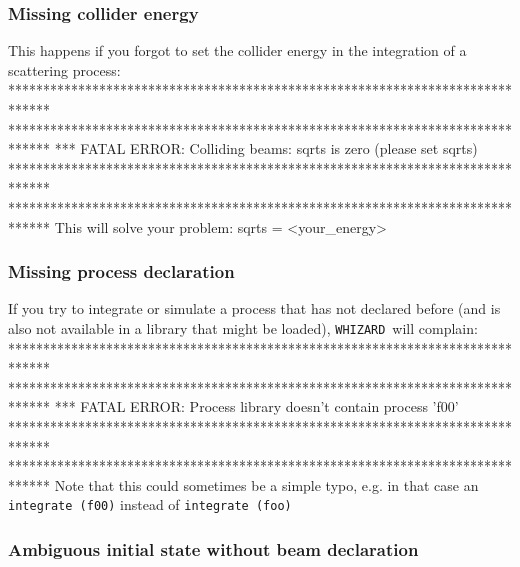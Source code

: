 \documentclass[12pt]{book}
\newenvironment{code}%
  {\begingroup\footnotesize
   \quote
   \Verbatim}%
  {\endVerbatim
   \endquote
   \endgroup\noindent}
\newenvironment{Code}%
  {\begingroup\footnotesize
   \quote
   \Verbatim[frame=single]}%
  {\endVerbatim
   \endquote
   \endgroup\noindent}
\newcommand{\ttt}[1]{\texttt{#1}}
\newcommand{\whizard}{\ttt{WHIZARD}}
\begin{document}
\subsubsection{Missing collider energy}

This happens if you forgot to set the collider energy in the
integration of a scattering process:
\begin{Code}
******************************************************************************
******************************************************************************
*** FATAL ERROR:  Colliding beams: sqrts is zero (please set sqrts)
******************************************************************************
******************************************************************************
\end{Code}
This will solve your problem:
\begin{code}
sqrts = <your_energy>
\end{code}

\subsubsection{Missing process declaration}

If you try to integrate or simulate a process that has not declared
before (and is also not available in a library that might be loaded),
\whizard\ will complain:
\begin{Code}
******************************************************************************
******************************************************************************
*** FATAL ERROR: Process library doesn't contain process 'f00'
******************************************************************************
******************************************************************************
\end{Code}
Note that this could sometimes be a simple typo, e.g. in that case an
\ttt{integrate (f00)} instead of \ttt{integrate (foo)}

\subsubsection{Ambiguous initial state without beam declaration}
\end{document}
